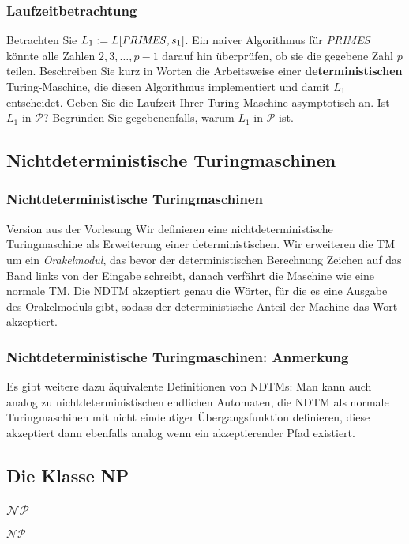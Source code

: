 \documentclass{beamer}
\begin{document}
{\begin{frame}
 \frametitle{Laufzeitbetrachtung}
 Betrachten Sie $L_1 := L[\text{\textit{PRIMES}},s_1]$. 
Ein naiver Algorithmus für \textit{PRIMES} könnte alle Zahlen $2,3,\ldots,p-1$ darauf hin überprüfen, ob sie die gegebene Zahl $p$ teilen. 
Beschreiben Sie kurz in Worten die Arbeitsweise einer \textbf{deterministischen} Turing-Maschine, die diesen Algorithmus implementiert und damit $L_1$ entscheidet. 
Geben Sie die Laufzeit Ihrer Turing-Maschine asymptotisch an. Ist $L_1$ in $\mathcal{P}$? Begründen Sie gegebenenfalls, warum $L_1$ in $\mathcal{P}$ ist.
\end{frame}

\subsection{Nichtdeterministische Turingmaschinen}
\begin{frame}
\frametitle{Nichtdeterministische Turingmaschinen}

\begin{block}{Version aus der Vorlesung}
Wir definieren eine nichtdeterministische Turingmaschine als Erweiterung einer deterministischen.
 Wir erweiteren die TM um ein \emph{Orakelmodul}, das bevor der deterministischen Berechnung Zeichen auf das Band links von der Eingabe schreibt,
 danach verfährt die Maschine wie eine normale TM.
 Die NDTM akzeptiert genau die Wörter, für die es eine Ausgabe des Orakelmoduls gibt,
 sodass der deterministische Anteil der Machine das Wort akzeptiert.
\end{block}
\end{frame}
\begin{frame}
\frametitle{Nichtdeterministische Turingmaschinen: Anmerkung}
Es gibt weitere dazu äquivalente Definitionen von NDTMs:
 Man kann auch analog zu nichtdeterministischen endlichen Automaten, die NDTM als normale Turingmaschinen mit nicht eindeutiger Übergangsfunktion definieren,
 diese akzeptiert dann ebenfalls analog wenn ein akzeptierender Pfad existiert.\\
\end{frame}

\subsection{Die Klasse NP}
\begin{frame}
\frametitle{$\mathcal{NP}$}
\begin{block}{$\mathcal{NP}$}


\end{block}
\end{frame}}
\end{document}

